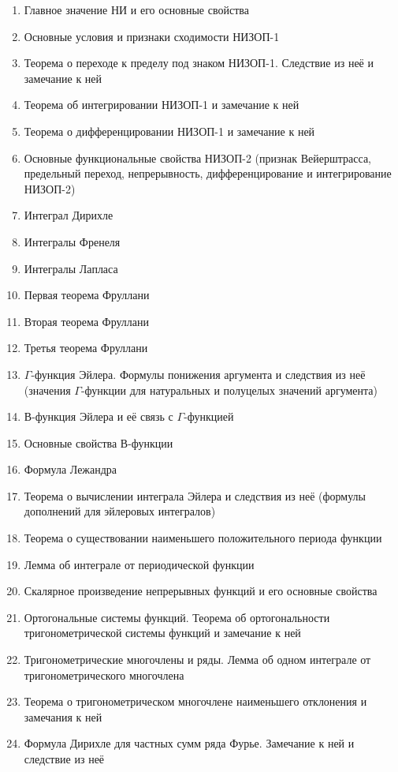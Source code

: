 \documentclass[../main.tex]{subfiles}
\begin{document}
\begin{enumerate}
    \item Главное значение НИ и его основные свойства
    \item Основные условия и признаки сходимости НИЗОП-1
    \item Теорема о переходе к пределу под знаком НИЗОП-1. Следствие из неё и замечание к ней
    \item Теорема об интегрировании НИЗОП-1 и замечание к ней
    \item Теорема о дифференцировании НИЗОП-1 и замечание к ней
    \item Основные функциональные свойства НИЗОП-2 (признак Вейерштрасса, предельный переход, непрерывность, дифференцирование и интегрирование НИЗОП-2)
    \item Интеграл Дирихле
    \item Интегралы Френеля
    \item Интегралы Лапласа
    \item Первая теорема Фруллани
    \item Вторая теорема Фруллани
    \item Третья теорема Фруллани
    \item $\Gamma$-функция Эйлера. Формулы понижения аргумента и следствия из неё (значения $\Gamma$-функции для натуральных и полуцелых значений аргумента)
    \item В-функция Эйлера и её связь с $\Gamma$-функцией
    \item Основные свойства В-функции
    \item Формула Лежандра
    \item Теорема о вычислении интеграла Эйлера и следствия из неё (формулы дополнений для эйлеровых интегралов)
    \item Теорема о существовании наименьшего положительного периода функции
    \item Лемма об интеграле от периодической функции
    \item Скалярное произведение непрерывных функций и его основные свойства
    \item Ортогональные системы функций. Теорема об ортогональности тригонометрической системы функций и замечание к ней
    \item Тригонометрические многочлены и ряды. Лемма об одном интеграле от тригонометрического многочлена
    \item Теорема о тригонометрическом многочлене наименьшего отклонения и замечания к ней
    \item Формула Дирихле для частных сумм ряда Фурье. Замечание к ней и следствие из неё

\end{enumerate}
\end{document}
